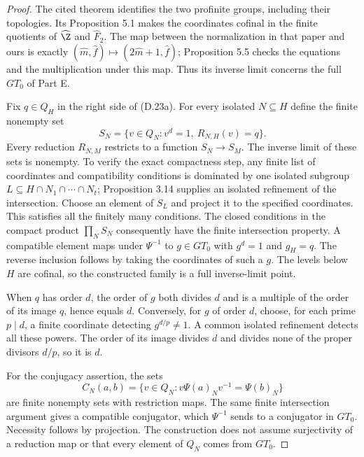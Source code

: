 \begin{proof}
The cited theorem identifies the two profinite groups, including their
topologies. Its Proposition 5.1 makes the coordinates cofinal in the
finite quotients of $\widehat\Z$ and $\widehat F_2$. The map between
the normalization in that paper and ours is exactly
$(\widehat m,\widehat f)\mapsto(2\widehat m+1,\widehat f)$;
Proposition 5.5 checks the equations and the multiplication under this
map. Thus its inverse limit concerns the full $GT_0$ of Part E.

Fix $q\in Q_H$ in the right side of (D.23a). For every isolated
$N\subseteq H$ define the finite nonempty set
\[
 S_N=\{v\in Q_N:v^d=1,\ R_{N,H}(v)=q\}.
\]
Every reduction $R_{N,M}$ restricts to a function $S_N\to S_M$.
The inverse limit of these sets is nonempty. To verify the exact
compactness step, any finite list of coordinates and compatibility
conditions is dominated by one isolated subgroup
$L\subseteq H\cap N_1\cap\cdots\cap N_t$; Proposition 3.14 supplies
an isolated refinement of the intersection. Choose an element of
$S_L$ and project it to the specified coordinates. This satisfies
all the finitely many conditions. The closed conditions in the
compact product $\prod_NS_N$ consequently have the finite
intersection property. A compatible element maps under
$\Psi^{-1}$ to $g\in GT_0$ with $g^d=1$ and $g_H=q$.
The reverse inclusion follows by taking the coordinates of such a
$g$. The levels below $H$ are cofinal, so the constructed family is
a full inverse-limit point.

When $q$ has order $d$, the order of $g$ both divides $d$ and is a
multiple of the order of its image $q$, hence equals $d$.
Conversely, for $g$ of order $d$, choose, for each prime $p\mid d$,
a finite coordinate detecting $g^{d/p}\ne1$. A common isolated
refinement detects all these powers. The order of its image divides
$d$ and divides none of the proper divisors $d/p$, so it is $d$.

For the conjugacy assertion, the sets
\[
 C_N(a,b)=\{v\in Q_N:v\Psi(a)_Nv^{-1}=\Psi(b)_N\}
\]
are finite nonempty sets with restriction maps. The same finite
intersection argument gives a compatible conjugator, which
$\Psi^{-1}$ sends to a conjugator in $GT_0$. Necessity follows by
projection. The construction does not assume surjectivity of a
reduction map or that every element of $Q_N$ comes from $GT_0$.
\end{proof}

